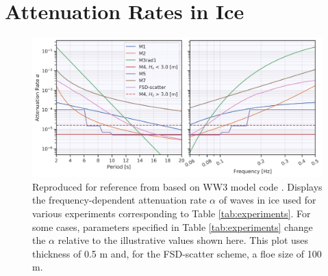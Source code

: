 \documentclass [11pt, proquest] {uwthesis}[2020/02/24]
\begin{document}
\section{Attenuation Rates in Ice}
\begin{figure}[H]
    \noindent\includegraphics[width=1.0\textwidth]{alpha_01.png}
    \caption{Reproduced for reference from \cite{Collins2017ANRL/MR/7320179726} based on WW3 model code \cite{TheWAVEWATCHIIIRDevelopmentGroupWW3DG2016User5.16}. Displays the frequency-dependent attenuation rate $\alpha$ of waves in ice used for various experiments corresponding to Table \ref{tab:experiments}. For some cases, parameters specified in Table \ref{tab:experiments} change the $\alpha$ relative to the illustrative values shown here. This plot uses thickness of 0.5 m and, for the FSD-scatter scheme, a floe size of 100 m.}
    \label{SI:alpha}
\end{figure}
\end{document}

